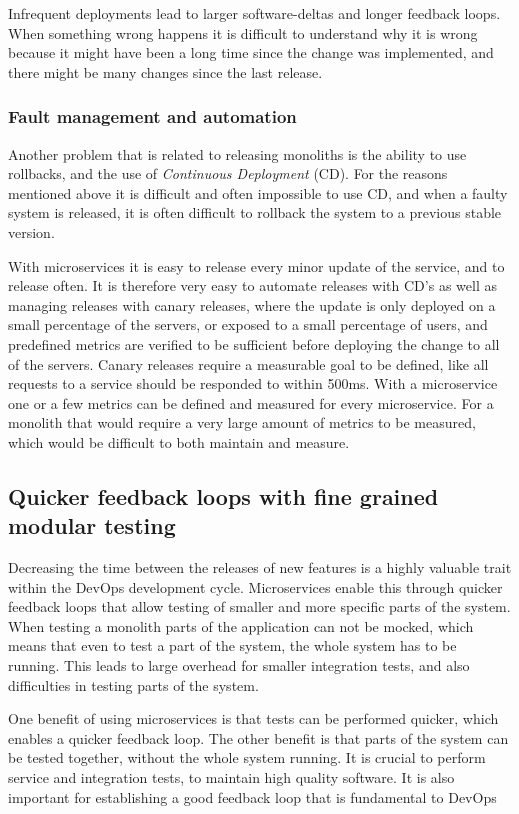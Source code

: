 \documentclass[a4paper]{article}
\begin{document}
Infrequent deployments lead to larger software-deltas and longer feedback loops. When something wrong happens it is difficult to understand why it is wrong because it might have been a long time since the change was implemented, and there might be many changes since the last release.

\subsubsection{Fault management and automation}
Another problem that is related to releasing monoliths is the ability to use rollbacks, and the use of \textit{Continuous Deployment} (CD). For the reasons mentioned above it is difficult and often impossible to use CD, and when a faulty system is released, it is often difficult to rollback the system to a previous stable version.

With microservices it is easy to release every minor update of the service, and to release often. It is therefore very easy to automate releases with CD's as well as managing releases with canary releases, where the update is only deployed on a small percentage of the servers, or exposed to a small percentage of users, and predefined metrics are verified to be sufficient before deploying the change to all of the servers. Canary releases require a measurable goal to be defined, like all requests to a service should be responded to within 500ms. With a microservice one or a few metrics can be defined and measured for every microservice. For a monolith that would require a very large amount of metrics to be measured, which would be difficult to both maintain and measure.


\subsection{Quicker feedback loops with fine grained modular testing}
Decreasing the time between the releases of new features is a highly valuable trait within the DevOps development cycle. Microservices enable this through quicker feedback loops that allow testing of smaller and more specific parts of the system. When testing a monolith parts of the application can not be mocked, which means that even to test a part of the system, the whole system has to be running. This leads to large overhead for smaller integration tests, and also difficulties in testing parts of the system.

One benefit of using microservices is that tests can be performed quicker, which enables a quicker feedback loop. The other benefit is that parts of the system can be tested together, without the whole system running. It is crucial to perform service and integration tests, to maintain high quality software. It is also important for establishing a good feedback loop that is fundamental to DevOps
\end{document}
